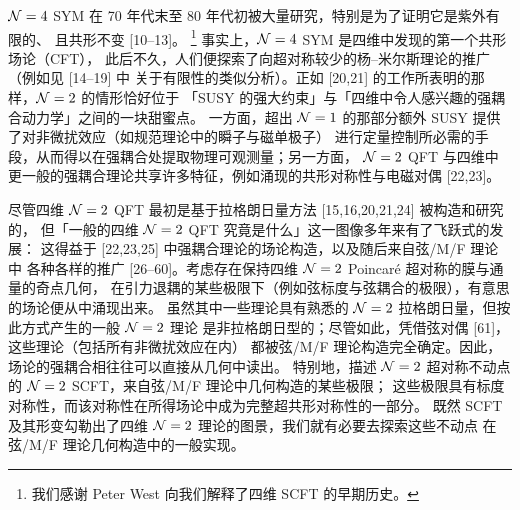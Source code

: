 $\mathcal{N}=4$ SYM 在 70 年代末至 80 年代初被大量研究，特别是为了证明它是紫外有限的、
且共形不变 [10--13]。%
\footnote{我们感谢 Peter West 向我们解释了四维 SCFT 的早期历史。}
事实上，$\mathcal{N}=4$ SYM 是四维中发现的第一个共形场论（CFT），
此后不久，人们便探索了向超对称较少的杨--米尔斯理论的推广（例如见 [14--19] 中
关于有限性的类似分析）。正如 [20,21] 的工作所表明的那样，$\mathcal{N}=2$ 的情形恰好位于
「SUSY 的强大约束」与「四维中令人感兴趣的强耦合动力学」之间的一块甜蜜点。
一方面，超出 $\mathcal{N}=1$ 的那部分额外 SUSY 提供了对非微扰效应（如规范理论中的瞬子与磁单极子）
进行定量控制所必需的手段，从而得以在强耦合处提取物理可观测量；另一方面，
$\mathcal{N}=2$ QFT 与四维中更一般的强耦合理论共享许多特征，例如涌现的共形对称性与电磁对偶 [22,23]。

尽管四维 $\mathcal{N}=2$ QFT 最初是基于拉格朗日量方法 [15,16,20,21,24] 被构造和研究的，
但「一般的四维 $\mathcal{N}=2$ QFT 究竟是什么」这一图像多年来有了飞跃式的发展：
这得益于 [22,23,25] 中强耦合理论的场论构造，以及随后来自弦/M/F 理论中
各种各样的推广 [26--60]。考虑存在保持四维 $\mathcal{N}=2$ Poincaré 超对称的膜与通量的奇点几何，
在引力退耦的某些极限下（例如弦标度与弦耦合的极限），有意思的场论便从中涌现出来。
虽然其中一些理论具有熟悉的 $\mathcal{N}=2$ 拉格朗日量，但按此方式产生的一般 $\mathcal{N}=2$ 理论
是非拉格朗日型的；尽管如此，凭借弦对偶 [61]，这些理论（包括所有非微扰效应在内）
都被弦/M/F 理论构造完全确定。因此，场论的强耦合相往往可以直接从几何中读出。
特别地，描述 $\mathcal{N}=2$ 超对称不动点的 $\mathcal{N}=2$ SCFT，来自弦/M/F 理论中几何构造的某些极限；
这些极限具有标度对称性，而该对称性在所得场论中成为完整超共形对称性的一部分。
既然 SCFT 及其形变勾勒出了四维 $\mathcal{N}=2$ 理论的图景，我们就有必要去探索这些不动点
在弦/M/F 理论几何构造中的一般实现。

